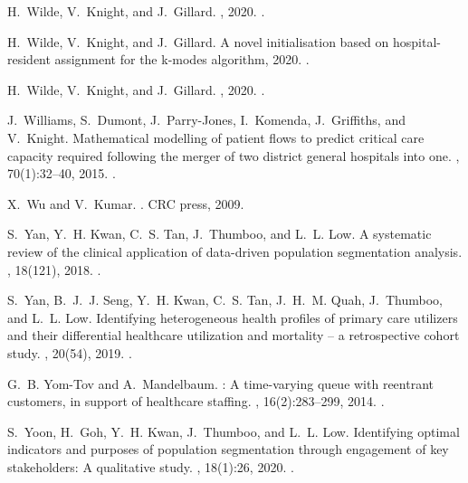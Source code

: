 \documentclass[11pt]{article}
\begin{document}
\begin{thebibliography}{10}
H.~Wilde, V.~Knight, and J.~Gillard.
, 2020.
\newblock \href {https://doi.org/10.5281/zenodo.3924716}
  {}.

H.~Wilde, V.~Knight, and J.~Gillard.
\newblock A novel initialisation based on hospital-resident assignment for the
  k-modes algorithm, 2020.
\newblock \href {http://arxiv.org/abs/2002.02701} {}.

H.~Wilde, V.~Knight, and J.~Gillard.
, 2020.
\newblock \href {https://doi.org/10.5281/zenodo.3908167}
  {}.

J.~Williams, S.~Dumont, J.~Parry-Jones, I.~Komenda, J.~Griffiths, and
  V.~Knight.
\newblock Mathematical modelling of patient flows to predict critical care
  capacity required following the merger of two district general hospitals into
  one.
, 70(1):32--40, 2015.
\newblock \href {https://doi.org/10.1111/anae.12839}
  {}.

X.~Wu and V.~Kumar.
.
\newblock CRC press, 2009.

S.~Yan, Y.~H. Kwan, C.~S. Tan, J.~Thumboo, and L.~L. Low.
\newblock A systematic review of the clinical application of data-driven
  population segmentation analysis.
, 18(121), 2018.
\newblock \href {https://doi.org/10.1186/s12874-018-0584-9}
  {}.

S.~Yan, B.~J.~J. Seng, Y.~H. Kwan, C.~S. Tan, J.~H.~M. Quah, J.~Thumboo, and
  L.~L. Low.
\newblock Identifying heterogeneous health profiles of primary care utilizers
  and their differential healthcare utilization and mortality – a
  retrospective cohort study.
, 20(54), 2019.
\newblock \href {https://doi.org/10.1186/s12875-019-0939-2}
  {}.

G.~B. Yom-Tov and A.~Mandelbaum.
: A time-varying queue with reentrant customers, in support
  of healthcare staffing.
, 16(2):283--299,
  2014.
\newblock \href {https://doi.org/10.1287/msom.2013.0474}
  {}.

S.~Yoon, H.~Goh, Y.~H. Kwan, J.~Thumboo, and L.~L. Low.
\newblock Identifying optimal indicators and purposes of population
  segmentation through engagement of key stakeholders: A qualitative study.
, 18(1):26, 2020.
\newblock \href {https://doi.org/10.1186/s12961-019-0519-x}
  {}.

\end{thebibliography}
\end{document}
